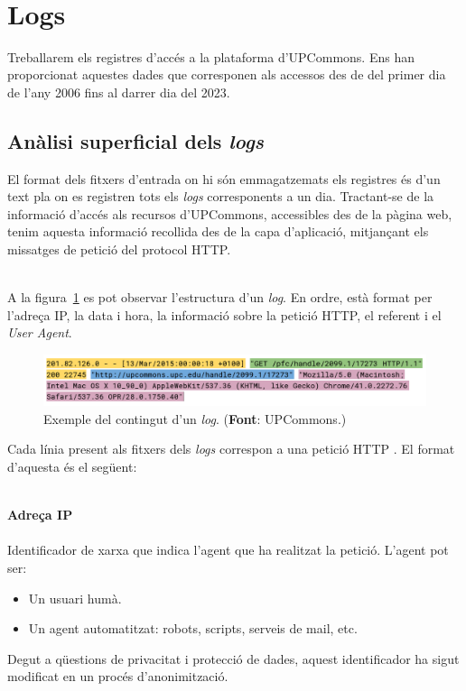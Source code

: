 \noindent \\
\section{Logs}\label{sec:logs-processing}

Treballarem els registres d'accés a la plataforma d'UPCommons.
Ens han proporcionat aquestes dades que corresponen als accessos des de del primer dia de l'any 2006 fins al darrer dia del 2023.

\clearpage

\subsection{Anàlisi superficial dels \textit{\gls{log}s}}\label{subsec:log-analysis}

El format dels fitxers d'entrada on hi són emmagatzemats els registres és d'un text pla on es registren tots els \textit{\gls{log}s} corresponents a un dia.
Tractant-se de la informació d'accés als recursos d'\gls{UPCommons}, accessibles des de la pàgina web,
tenim aquesta informació recollida des de la capa d'aplicació, mitjançant els missatges de petició del protocol \gls{HTTP}.

\noindent \\
A la figura~\ref{fig:example-log} es pot observar l'estructura d'un \textit{\gls{log}}.
En ordre, està format per l'adreça \gls{IP}, la data i hora, la informació sobre la petició \gls{HTTP}, el referent i el \textit{User Agent}.

\begin{figure}[htbp]
    \centerline{\includegraphics[width=1\textwidth]{figures/example-log}}
    \captionsetup{justification=centering}
    \caption[Exemple del contingut d'un \textit{\gls{log}}.]{Exemple del contingut d'un \textit{\gls{log}}. (\textbf{Font}: \gls{UPCommons}.)}\label{fig:example-log}
\end{figure}

\noindent
Cada línia present als fitxers dels \textit{\gls{log}s} correspon a una petició \gls{HTTP} .
El format d'aquesta és el següent:

\noindent \\
\textbf{Adreça \gls{IP}} \\ \\
Identificador de xarxa que indica l'agent que ha realitzat la petició.
L'agent pot ser:
\begin{itemize}
    \item Un usuari humà.
    \item Un agent automatitzat: robots, scripts, serveis de mail, etc.
\end{itemize}
Degut a qüestions de privacitat i protecció de dades, aquest identificador ha sigut modificat en un procés d'anonimització. \\

